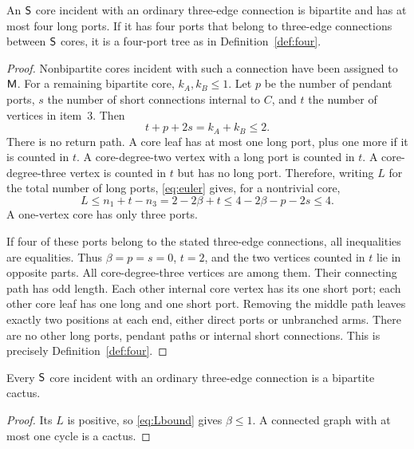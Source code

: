 \begin{lemma}\label{lem:count}
An $\mathsf S$ core incident with an ordinary three-edge connection is
bipartite and has at most four long ports.  If it has four ports that
belong to three-edge connections between $\mathsf S$ cores, it is a four-port
tree as in Definition~\ref{def:four}.
\end{lemma}
\begin{proof}
Nonbipartite cores incident with such a connection have been assigned
to $\mathsf M$.  For a remaining bipartite core, $k_A,k_B\le1$.
Let $p$ be the number of pendant ports, $s$ the number of short
connections internal to $C$, and $t$ the number of vertices in item~3.
Then
\begin{equation}\label{eq:budget}
 t+p+2s=k_A+k_B\le2.
\end{equation}
There is no return path.  A core leaf has at most one long port, plus
one more if it is counted in $t$.  A core-degree-two vertex with a long
port is counted in $t$.  A core-degree-three vertex is counted in $t$
but has no long port.  Therefore, writing $L$ for the total number of
long ports, \eqref{eq:euler} gives, for a nontrivial core,
\begin{equation}\label{eq:Lbound}
 L\le n_1+t-n_3=2-2\beta+t
 \le4-2\beta-p-2s\le4.
\end{equation}
A one-vertex core has only three ports.

If four of these ports belong to the stated three-edge connections,
all inequalities are equalities.  Thus $\beta=p=s=0$, $t=2$, and the
two vertices counted in $t$ lie in opposite parts.  All core-degree-three
vertices are among them.  Their connecting path has odd length.  Each
other internal core vertex has its one short port; each other core
leaf has one long and one short port.  Removing the middle path leaves
exactly two positions at each end, either direct ports or unbranched
arms.  There are no other long ports, pendant paths or internal short
connections.  This is precisely Definition~\ref{def:four}.
\end{proof}

\begin{corollary}\label{cor:cactus}
Every $\mathsf S$ core incident with an ordinary three-edge connection is a
bipartite cactus.
\end{corollary}
\begin{proof}
Its $L$ is positive, so \eqref{eq:Lbound} gives $\beta\le1$.
A connected graph with at most one cycle is a cactus.
\end{proof}


